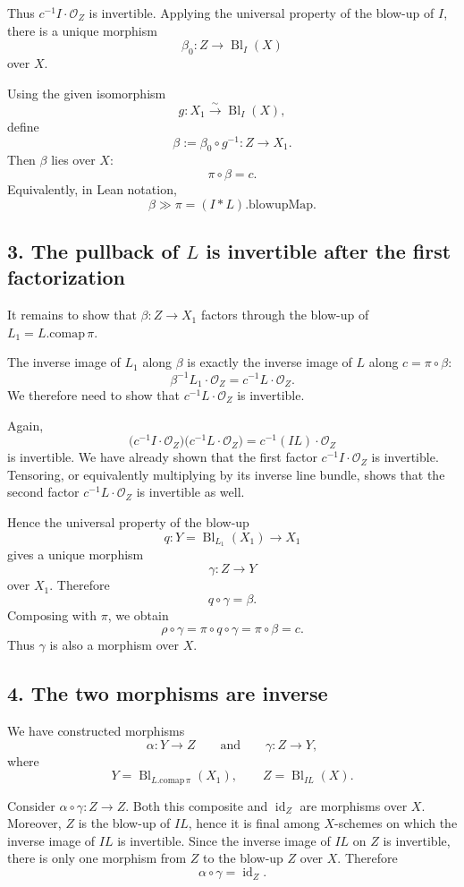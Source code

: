 \documentclass[11pt]{article}
\newcommand{\OO}{\mathcal O}
\newcommand{\Bl}{\operatorname{Bl}}
\begin{document}
Thus \(c^{-1}I\cdot\OO_Z\) is invertible.  Applying the universal property
of the blow-up of \(I\), there is a unique morphism
\[
  \beta_0:Z\longrightarrow \Bl_I(X)
\]
over \(X\).

Using the given isomorphism
\[
  g:X_1\xrightarrow{\sim}\Bl_I(X),
\]
define
\[
  \beta:=\beta_0\circ g^{-1}:Z\longrightarrow X_1.
\]
Then \(\beta\) lies over \(X\):
\[
  \pi\circ\beta=c.
\]
Equivalently, in Lean notation,
\[
  \beta\gg\pi=(I*L).\mathrm{blowupMap}.
\]

\subsection*{3. The pullback of \(L\) is invertible after the first factorization}

It remains to show that \(\beta:Z\to X_1\) factors through the blow-up of
\(L_1=L.\mathrm{comap}\,\pi\).

The inverse image of \(L_1\) along \(\beta\) is exactly the inverse image of
\(L\) along \(c=\pi\circ\beta\):
\[
  \beta^{-1}L_1\cdot\OO_Z
  =
  c^{-1}L\cdot\OO_Z.
\]
We therefore need to show that \(c^{-1}L\cdot\OO_Z\) is invertible.

Again,
\[
  \bigl(c^{-1}I\cdot\OO_Z\bigr)
  \bigl(c^{-1}L\cdot\OO_Z\bigr)
  =
  c^{-1}(I L)\cdot\OO_Z
\]
is invertible.  We have already shown that the first factor
\(c^{-1}I\cdot\OO_Z\) is invertible.  Tensoring, or equivalently multiplying
by its inverse line bundle, shows that the second factor
\(c^{-1}L\cdot\OO_Z\) is invertible as well.

Hence the universal property of the blow-up
\[
  q:Y=\Bl_{L_1}(X_1)\longrightarrow X_1
\]
gives a unique morphism
\[
  \gamma:Z\longrightarrow Y
\]
over \(X_1\).  Therefore
\[
  q\circ\gamma=\beta.
\]
Composing with \(\pi\), we obtain
\[
  \rho\circ\gamma
  =
  \pi\circ q\circ\gamma
  =
  \pi\circ\beta
  =
  c.
\]
Thus \(\gamma\) is also a morphism over \(X\).

\subsection*{4. The two morphisms are inverse}

We have constructed morphisms
\[
  \alpha:Y\longrightarrow Z
  \qquad\text{and}\qquad
  \gamma:Z\longrightarrow Y,
\]
where
\[
  Y=\Bl_{L.\mathrm{comap}\,\pi}(X_1),
  \qquad
  Z=\Bl_{I L}(X).
\]

Consider \(\alpha\circ\gamma:Z\to Z\).  Both this composite and
\(\operatorname{id}_Z\) are morphisms over \(X\).  Moreover, \(Z\) is the
blow-up of \(I L\), hence it is final among \(X\)-schemes on which the
inverse image of \(I L\) is invertible.  Since the inverse image of \(I L\)
on \(Z\) is invertible, there is only one morphism from \(Z\) to the
blow-up \(Z\) over \(X\).  Therefore
\[
  \alpha\circ\gamma=\operatorname{id}_Z.
\]
\end{document}
